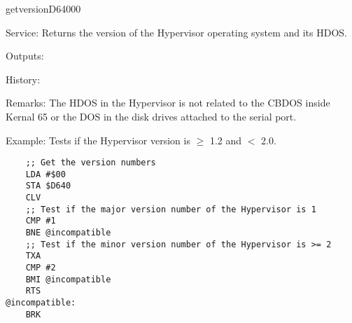\newpage
\begin{hyppotrap}{getversion}{D640}{00}
\item [Service:]
  Returns the version of the Hypervisor operating system and its HDOS.
\item [Outputs:]
\item [History:]
\item [Remarks:]
  The HDOS in the Hypervisor is not related to the CBDOS inside Kernal 65 or the
  DOS in the disk drives attached to the serial port.
\item [Example:]
  Tests if the Hypervisor version is $\geq$ 1.2 and $<$ 2.0.
\begin{tcolorbox}[colback=black,coltext=white]
\verbatimfont{\codefont}
\begin{verbatim}
    ;; Get the version numbers
    LDA #$00
    STA $D640
    CLV
    ;; Test if the major version number of the Hypervisor is 1
    CMP #1
    BNE @incompatible
    ;; Test if the minor version number of the Hypervisor is >= 2
    TXA
    CMP #2
    BMI @incompatible
    RTS
@incompatible:
    BRK
\end{verbatim}
\end{tcolorbox}
\end{hyppotrap}


